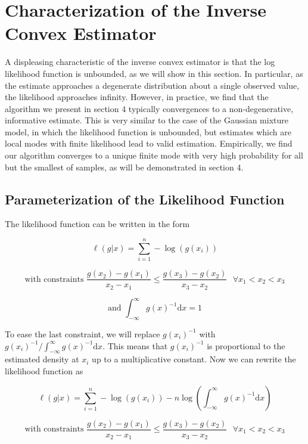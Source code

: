 \documentclass[11pt]{article}
\numberwithin{equation}{section}
\begin{document}
			
{\section{Characterization of the Inverse Convex Estimator} } 

	A displeasing characteristic of the inverse convex estimator is that the log likelihood function is unbounded, as we will show in this section. In particular, as the estimate approaches a degenerate distribution about a single observed value, the likelihood approaches infinity. However, in practice, we find that the algorithm we present in section 4 typically convergences to a non-degenerative, informative estimate. This is very similar to the case of the Gaussian mixture model, in which the likelihood function is unbounded, but estimates which are local modes with finite likelihood lead to valid estimation. Empirically, we find our algorithm converges to a unique finite mode with very high probability for all but the smallest of samples, as will be demonstrated in section 4. 
	
	{\subsection{Parameterization of the Likelihood Function} } 
	
	The likelihood function can be written in the form
	
	\[
	\ell(g| x ) =  \displaystyle \sum_{i = 1}^n -\log(g(x_i))
	\]
	
	\[
	\text{with constraints } \frac{g(x_2) - g(x_1)} { x_2 - x_1} \leq \frac{g(x_3) - g(x_2)} { x_3 - x_2} \text{ } \forall x_1 < x_2 < x_3
	\]
	
	\[
	\text{and } \displaystyle \int_{-\infty}^{\infty} g(x)^{-1} \mathrm{d}x = 1
	\]
	
	To ease the last constraint, we will replace $g(x_i)^{-1}$ with $g(x_i)^{-1}/ \displaystyle \int_{-\infty}^{\infty} g(x)^{-1} \mathrm{d}x$. This means that $g(x_i)^{-1}$ is proportional to the estimated density at $x_i$ up to a multiplicative constant. Now we can rewrite the likelihood function as 

	\[
	\ell(g| x ) = \displaystyle \sum_{i = 1}^n -\log(g(x_i)) - n \log\left(\displaystyle \int_{-\infty}^{\infty} g(x)^{-1} \mathrm{d}x \right)
	\]
	
	\[
	\text{with constraints } \frac{g(x_2) - g(x_1)} { x_2 - x_1} \leq \frac{g(x_3) - g(x_2)} { x_3 - x_2} \text{ } \forall x_1 < x_2 < x_3
	\]
\end{document}
